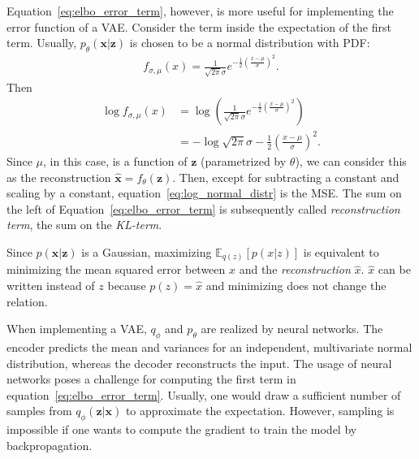 Equation~\ref{eq:elbo_error_term}, however, is more useful for implementing the error function of a \ac{VAE}.
Consider the term inside the expectation of the first term.
Usually, $p_\theta(\bm{x}|\bm{z})$ is chosen to be a normal distribution with \ac{PDF}:
\begin{align}
    f_{\sigma,\mu}(x) = \frac{1}{\sqrt{2\pi}\sigma}e^{-\frac{1}{2}\left( \frac{x-\mu}{\sigma} \right)^2}.
\end{align}
Then
\begin{align}
    \log f_{\sigma,\mu}(x) &= \log \left( \frac{1}{\sqrt{2\pi}\sigma}e^{-\frac{1}{2}\left( \frac{x-\mu}{\sigma} \right)^2} \right)\\
    &= - \log \sqrt{2\pi}\sigma -\frac{1}{2}\left( \frac{x-\mu}{\sigma} \right)^2. \label{eq:log_normal_distr}
\end{align}
Since $\mu$, in this case, is a function of $\bm{z}$ (parametrized by $\theta$), we can consider this as the reconstruction $\hat{\bm{x}} = f_\theta(\bm{z})$.
Then, except for subtracting a constant and scaling by a constant, equation~\ref{eq:log_normal_distr} is the \ac{MSE}.
The sum on the left of Equation~\ref{eq:elbo_error_term} is subsequently called \textit{reconstruction term}, the sum on the \textit{\ac{KL}-term}.

Since $p(\bm{x}|\bm{z})$ is a Gaussian, maximizing $\mathbb{E}_{q(z)} \left[ p(x|z) \right]$ is equivalent to minimizing the mean squared error between $x$ and the \textit{reconstruction} $\hat{x}$.
$\hat{x}$ can be written instead of $z$ because $p(z) = \hat{x}$ and minimizing does not change the relation.

When implementing a \ac{VAE}, $q_\phi$ and $p_\theta$ are realized by neural networks.
The encoder predicts the mean and variances for an independent, multivariate normal distribution, whereas the decoder reconstructs the input.
The usage of neural networks poses a challenge for computing the first term in equation~\ref{eq:elbo_error_term}.
Usually, one would draw a sufficient number of samples from $q_\phi(\bm{z}|\bm{x})$ to approximate the expectation.
However, sampling is impossible if one wants to compute the gradient to train the model by backpropagation.

